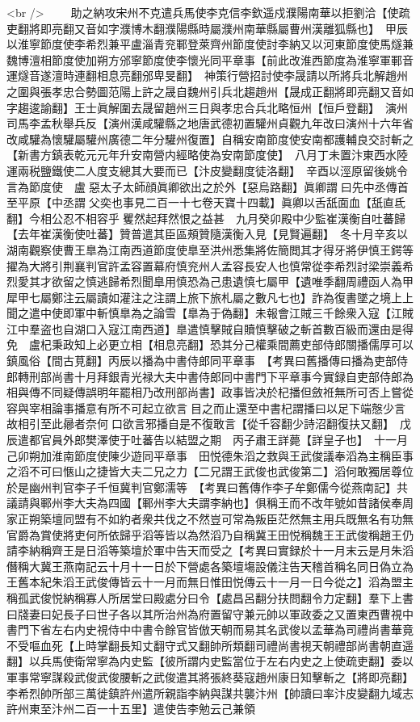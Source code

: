 <br />
　　助之納攻宋州不克遣兵馬使李克信李欽遥戍濮陽南華以拒劉洽【使疏吏翻將即亮翻又音如字濮博木翻濮陽縣時屬濮州南華縣屬曹州漢離狐縣也】　甲辰以淮寧節度使李希烈兼平盧淄青兖鄆登萊齊州節度使討李納又以河東節度使馬燧兼魏博澶相節度使加朔方邠寧節度使李懷光同平章事【前此改淮西節度為淮寧軍鄆音運燧音遂澶時連翻相息亮翻邠卑旻翻】　神策行營招討使李晟請以所將兵北解趙州之圍與張孝忠合勢圖范陽上許之晟自魏州引兵北趨趙州【晟成正翻將即亮翻又音如字趨逡諭翻】王士眞解圍去晟留趙州三日與孝忠合兵北略恒州【恒戶登翻】　演州司馬李孟秋舉兵反【演州漢咸驩縣之地唐武德初置驩州貞觀九年改曰演州十六年省改咸驩為懷驩屬驩州廣德二年分驩州復置】自稱安南節度使安南都護輔良交討斬之【新書方鎮表乾元元年升安南營内經略使為安南節度使】　八月丁未置汴東西水陸運兩税鹽鐵使二人度支總其大要而已【汴皮變翻度徒洛翻】　辛酉以涇原留後姚令言為節度使　盧惡太子太師顔眞卿欲出之於外【惡烏路翻】眞卿謂曰先中丞傳首至平原【中丞謂父奕也事見二百一十七卷天寶十四載】眞卿以舌舐面血【舐直氐翻】今相公忍不相容乎矍然起拜然恨之益甚　九月癸卯殿中少監崔漢衡自吐蕃歸【去年崔漢衡使吐蕃】贊普遣其臣區頰贊隨漢衡入見【見賢遍翻】　冬十月辛亥以湖南觀察使曹王臯為江南西道節度使臯至洪州悉集將佐簡閲其才得牙將伊慎王鍔等擢為大將引荆襄判官許孟容置幕府慎兖州人孟容長安人也慎常從李希烈討梁崇義希烈愛其才欲留之慎逃歸希烈聞臯用慎恐為己患遺慎七屬甲【遺唯季翻周禮函人為甲犀甲七屬鄭注云屬讀如灌注之注謂上旅下旅札屬之數凡七也】詐為復書墜之境上上聞之遣中使即軍中斬慎臯為之論雪【臯為于偽翻】未報會江賊三千餘衆入寇【江賊江中羣盗也自湖口入寇江南西道】臯遣慎擊賊自贖慎擊破之斬首數百級而還由是得免　盧杞秉政知上必更立相【相息亮翻】恐其分己權乘間薦吏部侍郎關播儒厚可以鎮風俗【間古莧翻】丙辰以播為中書侍郎同平章事　【考異曰舊播傳曰播為吏部侍郎轉刑部尚書十月拜銀青光禄大夫中書侍郎同中書門下平章事今實録自吏部侍郎為相與傳不同疑傳誤明年罷相乃改刑部尚書】政事皆决於杞播但斂袵無所可否上嘗從容與宰相論事播意有所不可起立欲言目之而止還至中書杞謂播曰以足下端慤少言故相引至此曏者奈何口欲言邪播自是不復敢言【從千容翻少詩沼翻復扶又翻】　戊辰遣都官員外郎樊澤使于吐蕃告以結盟之期　丙子肅王詳薨【詳皇子也】　十一月己卯朔加淮南節度使陳少遊同平章事　田悦德朱滔之救與王武俊議奉滔為主稱臣事之滔不可曰愜山之捷皆大夫二兄之力【二兄謂王武俊也武俊第二】滔何敢獨居尊位於是幽州判官李子千恒冀判官鄭濡等　【考異曰舊傳作李子牟鄭儒今從燕南記】共議請與鄆州李大夫為四國【鄆州李大夫謂李納也】俱稱王而不改年號如昔諸侯奉周家正朔築壇同盟有不如約者衆共伐之不然豈可常為叛臣茫然無主用兵既無名有功無官爵為賞使將吏何所依歸乎滔等皆以為然滔乃自稱冀王田悦稱魏王王武俊稱趙王仍請李納稱齊王是日滔等築壇於軍中告天而受之【考異曰實録於十一月末云是月朱滔僭稱大冀王燕南記云十月十一日於下營處各築壇塲設儀注告天稽首稱名同日偽立為王舊本紀朱滔王武俊傳皆云十一月而無日惟田悦傳云十一月一日今從之】滔為盟主稱孤武俊悦納稱寡人所居堂曰殿處分曰令【處昌呂翻分扶問翻令力定翻】羣下上書曰牋妻曰妃長子曰世子各以其所治州為府置留守兼元帥以軍政委之又置東西曹視中書門下省左右内史視侍中中書令餘官皆倣天朝而易其名武俊以孟華為司禮尚書華竟不受嘔血死【上時掌翻長知丈翻守式又翻帥所類翻司禮尚書視天朝禮部尚書朝直遥翻】以兵馬使衛常寧為内史監【彼所謂内史監當位于左右内史之上使疏吏翻】委以軍事常寧謀殺武俊武俊腰斬之武俊遣其將張終葵寇趙州康日知擊斬之【將即亮翻】李希烈帥所部三萬徙鎮許州遣所親詣李納與謀共襲汴州【帥讀曰率汴皮變翻九域志許州東至汴州二百一十五里】遣使告李勉云己兼領
